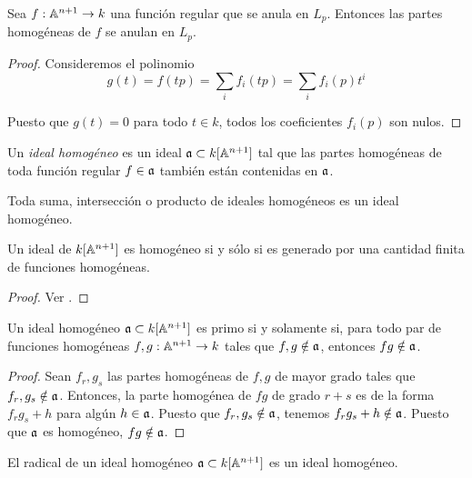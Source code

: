 \begin{proposition}
Sea $f : \mathbb A^{n+1} \to k$ una función regular que se anula en $L_p$. Entonces las partes homogéneas de $f$ se anulan en $L_p$.
\end{proposition}

\begin{proof}
Consideremos el polinomio
$$g(t) = f(tp) = \sum_i f_i(tp) = \sum_i f_i(p) t^i$$

Puesto que $g(t) = 0$ para todo $t \in k$, todos los coeficientes $f_i(p)$ son nulos.
\end{proof}

\begin{definition}
Un \textit{ideal homogéneo} es un ideal $\mathfrak a \subset k[\mathbb A^{n+1}]$ tal que las partes homogéneas de toda función regular $f \in \mathfrak a$ también están contenidas en $\mathfrak a$.
\end{definition}

\begin{remark}
Toda suma, intersección o producto de ideales homogéneos es un ideal homogéneo.
\end{remark}

\begin{proposition}
Un ideal de $k[\mathbb A^{n+1}]$ es homogéneo si y sólo si es generado por una cantidad finita de funciones homogéneas.
\end{proposition}

\begin{proof}
Ver \cite[p. 89]{fulton}.
\end{proof}

\begin{proposition}
Un ideal homogéneo $\mathfrak a \subset k[\mathbb A^{n+1}]$ es primo si y solamente si, para todo par de funciones homogéneas $f, g : \mathbb A^{n+1} \to k$ tales que $f, g \notin \mathfrak a$, entonces $fg \notin \mathfrak a$.
\end{proposition}

\begin{proof}
Sean $f_r, g_s$ las partes homogéneas de $f, g$ de mayor grado tales que $f_r, g_s \notin \mathfrak a$. Entonces, la parte homogénea de $fg$ de grado $r+s$ es de la forma $f_r g_s + h$ para algún $h \in \mathfrak a$. Puesto que $f_r, g_s \notin \mathfrak a$, tenemos $f_r g_s + h \notin \mathfrak a$. Puesto que $\mathfrak a$ es homogéneo, $fg \notin \mathfrak a$.
\end{proof}

\begin{proposition}
El radical de un ideal homogéneo $\mathfrak a \subset k[\mathbb A^{n+1}]$ es un ideal homogéneo.
\end{proposition}

